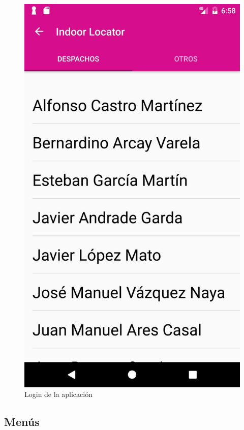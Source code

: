 \documentclass[12pt, a4paper, titlepage]{article}
\begin{document}
	\begin{figure}[h!]
		\begin{center}
			\includegraphics[scale=0.30]{img/despachos.jpg}
			\caption{Login de la aplicación}
			\label{despachos}
		\end{center}
	\end{figure}
	
	\clearpage
	
	\subsection{Menús}
	
\end{document}
